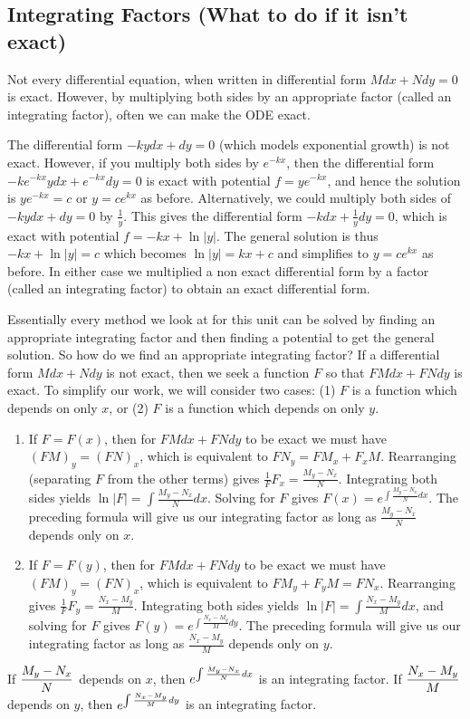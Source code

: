 \subsection{Integrating Factors (What to do if it isn't exact)}

Not every differential equation, when written in differential form $Mdx+Ndy=0$ is exact.  However, by multiplying both sides by an appropriate factor (called an integrating factor), often we can make the ODE exact. 

\begin{example}
The differential form $-kydx+dy=0$ (which models exponential growth) is not exact. However, if you multiply both sides by $e^{-kx}$, then the differential form $-ke^{-kx}ydx+e^{-kx}dy=0$ is exact with potential $f=ye^{-kx}$, and hence the solution is $ye^{-kx}=c$ or $y=ce^{kx}$ as before.  Alternatively, we could multiply both sides of $-kydx+dy=0$ by $\frac{1}{y}$. This gives the differential form $-kdx+\frac{1}{y}dy=0$, which is exact with potential $f=-kx+\ln|y|$. The general solution is thus $-kx+\ln|y|=c$ which becomes $\ln|y|=kx+c$ and simplifies to $y=ce^{kx}$ as before. In either case we multiplied a non exact differential form by a factor (called an integrating factor) to obtain an exact differential form.  
\end{example}

Essentially every method we look at for this unit can be solved by finding an appropriate integrating factor and then finding a potential to get the general solution. So how do we find an appropriate integrating factor? If a differential form $Mdx+Ndy$ is not exact, then we seek a function $F$ so that $FMdx+FNdy$ is exact.  To simplify our work, we will consider two cases: (1) $F$ is a function which depends on only $x$, or (2) $F$ is a function which depends on only $y$.  
\begin{enumerate}
	\item If $F=F(x)$, then for $FMdx+FNdy$ to be exact we must have $(FM)_y=(FN)_x$, which is equivalent to $FN_y = FM_x+F_xM$. Rearranging (separating $F$ from the other terms) gives $ \frac{1}{F}F_x = \frac{M_y-N_x}{N}$. Integrating both sides yields $ \ln|F| = \int\frac{M_y-N_x}{N}dx$.  Solving for $F$ gives $ F(x)=e^{\int\frac{M_y-N_x}{N}dx}$. The preceding formula will give us our integrating factor as long as  $ \frac{M_y-N_x}{N}$ depends only on $x$.
	\item If $F=F(y)$, then for $FMdx+FNdy$ to be exact we must have $(FM)_y=(FN)_x$, which is equivalent to $FM_y+F_yM = FN_x$. Rearranging gives $ \frac{1}{F}F_y = \frac{N_x-M_y}{M}$. Integrating both sides yields $ \ln|F| = \int\frac{N_x-M_y}{M}dx$, and solving for $F$ gives $ F(y)=e^{\int\frac{N_x-M_y}{M}dy}$. The preceding formula will give us our integrating factor as long as  $ \frac{N_x-M_y}{M}$ depends only on $y$.

\end{enumerate}
\begin{observation}
If  $\displaystyle \frac{M_y-N_x}{N}$ depends on $x$, then $\displaystyle e^{\int \frac{M_y-N_x}{N} dx}$ is an integrating factor. If $\displaystyle\frac{N_x-M_y}{M}$ depends on $y$, then $\displaystyle e^{\int \frac{N_x-M_y}{M} dy}$ is an integrating factor.
\end{observation}

